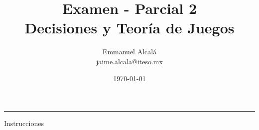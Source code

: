 \documentclass[12pt]{scrartcl} %
\title{Examen - Parcial 2 \\ \normalsize Decisiones y Teoría de Juegos}
\author{Emmanuel Alcalá\\ \url{jaime.alcala@iteso.mx}}
\date{\today}
\begin{document}
\maketitle
\hrule

\begin{summarybox}{Instrucciones}


  \begin{description} %


\end{description}
\end{summarybox}
\end{document}

